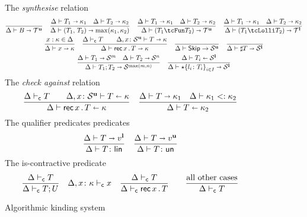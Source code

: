 \begin{figure}[h!]
  The \emph{synthesise} relation \hfill{}
  \begin{gather*}
    \frac{}{\algkindout{\tcBase}{\kindt^\Un}}
    \quad 
    \frac{
      \algkindout{T_1}{\kind_1}
      \quad
      \algkindout{T_2}{\kind_2}
    }{
      \algkindout{\tPair{T_1}{T_2}}{\max(\kind_1, \kind_2)}
    }
    \quad
    \frac{
      \algkindout{T_1}{\kind_1}
      \quad
      \algkindout{T_2}{\kind_2}
    }{
      \algkindout{(\tUnFun{T_1}{T_2})}{\kindt^\Un}
    }
    \quad
    \frac{
      \algkindout{T_1}{\kind_1}
      \quad
      \algkindout{T_2}{\kind_2}
    }{
      \algkindout{(\tLinFun{T_1}{T_2})}{\kindt^\Lin}
    }
    \\
    \frac{x : \kind \in \kindEnv}{\algkindout x \kind}
   \quad
  \frac{
    \contractive T
    \qquad
    \algkindout[\kindEnv, x\colon \kinds^\Un] T \kind
  }{
    \algkindout{\tRec xT}{\kind}
  }
  \quad
  \frac{}{\kindEnv \Alg \tskip \rightarrow \kinds^\Un}
  \quad 
  \frac{}{\algkindout{\tMsg T}{\kinds^\Lin}}
  \\
  \frac{
    \algkindout{T_1}{\kinds^m}
    \quad
    \algkindout{T_2}{\kinds^n}
  }{
    \algkindout{\tSemi{T_1}{T_2}}{\kinds^{\max(m,n)}}
  }
  \quad
  \frac{
    \algkindin{T_i}{\kinds^\Lin}
  }{
    \algkindout{\tChoice{\{l_i\colon T_i\}}_{i\in I}}{\kinds^\Lin}
  }
  \end{gather*}
  The \emph{check against} relation\hfill{}
  \begin{equation*}
    \frac{
      \contractive T
      \qquad
      \algkindin[\kindEnv, x\colon \kinds^\Un] T \kind
    }{
      \algkindin{\tRec xT}{\kind}
    }
    \quad
    \frac{
      \algkindout{T}{\kind_1}
      \quad
      \subkind{\kind_1}{\kind_2}
    }{
      \algkindin T {\kind_2}
    }
  \end{equation*}
  The qualifier predicates predicates \hfill{}\quad{}
  \begin{equation*}
    \frac{
      \algkindout T {v^\Lin}
    }{
      \isLin T
    }
    \quad
    \frac{
      \algkindout T {v^\Un}
    }{
      \isUn T
    }
  \end{equation*}
  The is-contractive predicate 
  \begin{equation*}
    \frac{
      \contractive{T}
    }{
      \contractive{T;U}
    }
    \quad
    \contractive[\kindEnv,x\colon\kind]{x}
    \quad 
    \frac{
      \contractive{T}
    }{
      \contractive{\tRecK xT}
    }
    \qquad
    \frac{\text{all other cases}}{\contractive{T}}
  \end{equation*}
  \caption{Algorithmic kinding system}
  \label{fig:kinding-system}
\end{figure}

